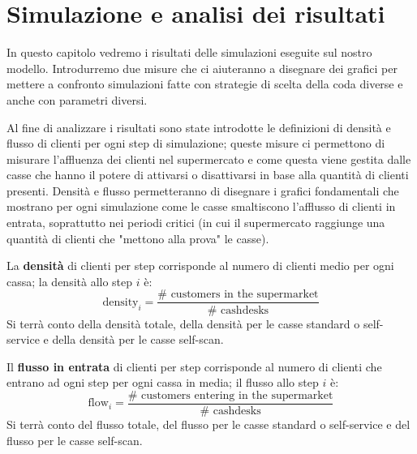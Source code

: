 \chapter{Simulazione e analisi dei risultati}
\label{chapter:simulation}

In questo capitolo vedremo i risultati delle simulazioni eseguite sul nostro modello. Introdurremo due misure che ci aiuteranno a disegnare dei grafici per mettere a confronto simulazioni fatte con strategie di scelta della coda diverse e anche con parametri diversi.

\vspace*{1\baselineskip}


Al fine di analizzare i risultati sono state introdotte le definizioni di densità e flusso di clienti per ogni step di simulazione; queste misure ci permettono di misurare l'affluenza dei clienti nel supermercato e come questa viene gestita dalle casse che hanno il potere di attivarsi o disattivarsi in base alla quantità di clienti presenti. Densità e flusso permetteranno di disegnare i grafici fondamentali che mostrano per ogni simulazione come le casse smaltiscono l'afflusso di clienti in entrata, soprattutto nei periodi critici (in cui il supermercato raggiunge una quantità di clienti che "mettono alla prova" le casse).

La \textbf{densità} di clienti per step corrisponde al numero di clienti medio per ogni cassa; la densità allo step $i$ è:
\begin{equation}
	\text{density}_i = \frac{\# \text{ customers in the supermarket}}{\# \text{ cashdesks}}
\end{equation}
Si terrà conto della densità totale, della densità per le casse standard o self-service e della densità per le casse self-scan.

Il \textbf{flusso in entrata} di clienti per step corrisponde al numero di clienti che entrano ad ogni step per ogni cassa in media; il flusso allo step $i$ è:
\begin{equation}
	\text{flow}_i = \frac{\# \text{ customers entering in the supermarket}}{\# \text{ cashdesks}}
\end{equation}
Si terrà conto del flusso totale, del flusso per le casse standard o self-service e del flusso per le casse self-scan.

